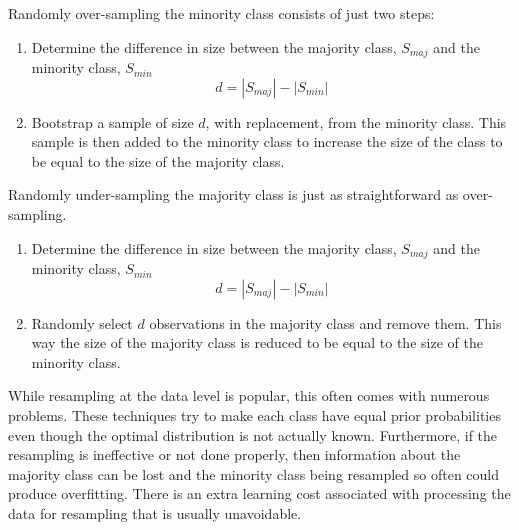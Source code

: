 \documentclass[a4paper]{article}
\begin{document}
Randomly over-sampling the minority class consists of just two steps:

\begin{enumerate}
\item Determine the difference in size between the majority class, $S_{maj}$ and the minority class, $S_{min}$
$$d=|S_{maj}|-|S_{min}|$$
\item Bootstrap a sample of size $d$, with replacement, from the minority class. This sample is then added to the minority class to increase the size of the class to be equal to the size of the majority class.
\end{enumerate}

Randomly under-sampling the majority class is just as straightforward as over-sampling.

\begin{enumerate}
\item Determine the difference in size between the majority class, $S_{maj}$ and the minority class, $S_{min}$
$$d=|S_{maj}|-|S_{min}|$$
\item Randomly select $d$ observations in the majority class and remove them. This way the size of the majority class is reduced to be equal to the size of the minority class.
\end{enumerate}    
    
    
    While resampling at the data level is popular, this often comes with numerous problems. These techniques try to make each class have equal prior probabilities even though the optimal distribution is not actually known. Furthermore, if the resampling is ineffective or not done properly, then information about the majority class can be lost and the minority class being resampled so often could produce overfitting. There is an extra learning cost associated with processing the data for resampling that is usually unavoidable.%
    
\end{document}
